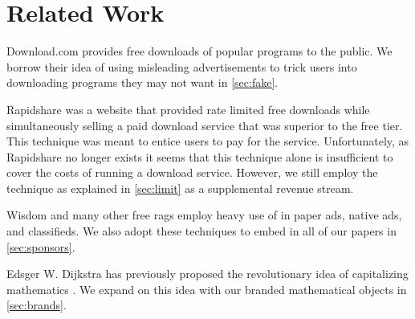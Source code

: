 \section{Related Work}
\label{sec:related}

Download.com \cite{download-com} provides free downloads of popular programs to
the public.
We borrow their idea of using misleading advertisements to trick users into
downloading programs they may not want in \autoref{sec:fake}.

Rapidshare \cite{rapidshare} was a website that provided rate limited free
downloads while simultaneously selling a paid download service that was
superior to the free tier.
This technique was meant to entice users to pay for the service.
Unfortunately, as Rapidshare no longer exists it seems that this technique
alone is insufficient to cover the costs of running a download service.
However, we still employ the technique as explained in \autoref{sec:limit} as a
supplemental revenue stream.

Wisdom  and many other free rags employ heavy use of in paper ads,
native ads, and classifieds.
We also adopt these techniques to embed in all of our papers in
\autoref{sec:sponsors}.

Edsger W. Dijkstra has previously proposed the revolutionary idea of
capitalizing mathematics \cite{cap-math}.
We expand on this idea with our branded mathematical objects in
\autoref{sec:brands}.

